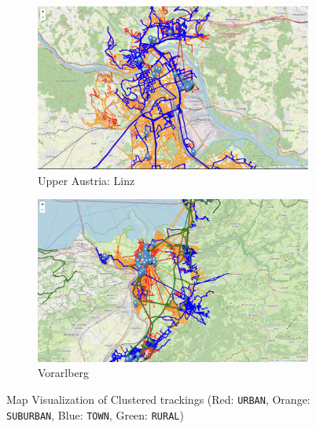 \documentclass[a4paper,12pt,twoside]{scrreprt}
\begin{document}
\begin{figure}[p]
  \begin{subfigure}[b]{0.495\textwidth}
    \centering

    \includegraphics[width=\textwidth]{Figures/clustering_map/clustering_result_map_linz_urban1.png}
    \caption{Upper Austria: Linz}
    \label{fig:clustering_map_visulaization_linz}
  \end{subfigure}
  \hfill
  \begin{subfigure}[b]{0.495\textwidth}
    \centering

    \includegraphics[width=\textwidth]{Figures/clustering_map/clustering_result_map_vorarlberg_closeup.png}
    \caption{Vorarlberg}
    \label{fig:clustering_map_visulaization_vorarlberg}
  \end{subfigure}

  \caption{Map Visualization of Clustered trackings (Red: \texttt{URBAN},
    Orange: \texttt{SUBURBAN}, Blue: \texttt{TOWN}, Green: \texttt{RURAL})}
  \label{fig:clstering_map_visualizations}
\end{figure}
\FloatBarrier
\end{document}
